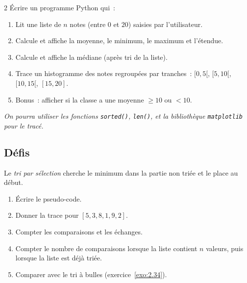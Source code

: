 \begin{probleme}{2}
\'Ecrire un programme Python qui~:
\begin{enumerate}
  \item Lit une liste de $n$ notes (entre $0$ et $20$) saisies par l'utilisateur.
  \item Calcule et affiche la moyenne, le minimum, le maximum et l'\'etendue.
  \item Calcule et affiche la m\'ediane (apr\`es tri de la liste).
  \item Trace un histogramme des notes regroup\'ees par tranches~:
        $[0,5[$, $[5,10[$, $[10,15[$, $[15,20]$.
  \item Bonus~: afficher si la classe a une moyenne $\geq 10$ ou $< 10$.
\end{enumerate}
\emph{On pourra utiliser les fonctions \texttt{sorted()}, \texttt{len()},
et la biblioth\`eque \texttt{matplotlib} pour le trac\'e.}
\end{probleme}

\subsection*{D\'efis}

\begin{challenge}
Le \emph{tri par s\'election} cherche le minimum dans la partie non tri\'ee
et le place au d\'ebut.
\begin{enumerate}
  \item \'Ecrire le pseudo-code.
  \item Donner la trace pour $[5, 3, 8, 1, 9, 2]$.
  \item Compter les comparaisons et les \'echanges.
  \item Compter le nombre de comparaisons lorsque la liste contient $n$
        valeurs, puis lorsque la liste est déjà triée.
  \item Comparer avec le tri \`a bulles (exercice~\ref{exo:2.34}).
\end{enumerate}
\end{challenge}

